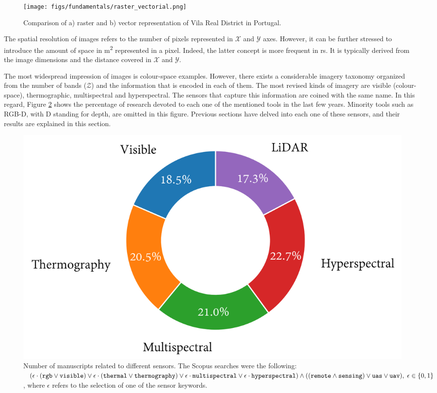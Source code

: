 \begin{figure}[ht]
	\texttt{[image: figs/fundamentals/raster\_vectorial.png]}
	\caption{Comparison of a) raster and b) vector representation of Vila Real District in Portugal.  }
    \label{fig:raster_vectorial}
\end{figure}

The spatial resolution of images refers to the number of pixels represented in $\mathcal{X}$ and $\mathcal{Y}$ axes. However, it can be further stressed to introduce the amount of space in \si{\meter^2} represented in a pixel. Indeed, the latter concept is more frequent in \acrshort{rs}. It is typically derived from the image dimensions and the distance covered in $\mathcal{X}$ and $\mathcal{Y}$.

The most widespread impression of images is colour-space examples. However, there exists a considerable imagery taxonomy organized from the number of bands ($\mathcal{Z}$) and the information that is encoded in each of them. The most revised kinds of imagery are visible (colour-space), thermographic, multispectral and hyperspectral. The sensors that capture this information are coined with the same name. In this regard, Figure \ref{fig:sensor_literature} shows the percentage of research devoted to each one of the mentioned tools in the last few years. Minority tools such as RGB-D, with D standing for depth, are omitted in this figure. Previous sections have delved into each one of these sensors, and their results are explained in this section.

\begin{figure}[ht]
	\includegraphics[width=.9\textwidth]{figs/fundamentals/literature_sensors.png}
	\caption{Number of manuscripts related to different sensors. The Scopus searches were the following: $(\epsilon \cdot (\mathtt{rgb} \lor \mathtt{visible}) \lor \epsilon \cdot (\mathtt{thermal} \lor \mathtt{thermography}) \lor \epsilon \cdot \mathtt{multispectral} \lor \epsilon \cdot \mathtt{hyperspectral}) \land ((\mathtt{remote} \land \mathtt{sensing}) \lor \mathtt{uas} \lor \mathtt{uav}), \hspace{1mm} \epsilon \in \{0, 1\}$, where $\epsilon$ refers to the selection of one of the sensor keywords.   }
    \label{fig:sensor_literature}
\end{figure}

